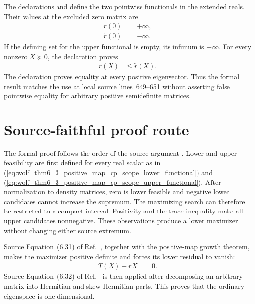 \documentclass[11pt]{article}
\begin{document}
The declarations  and
 define the two pointwise functionals in the
extended reals. Their values at the excluded zero matrix are
\begin{align}
  r(0)
    &=+\infty,
  \label{eq:wolf_thm6_3_positive_map_cp_scope_zero_lower_value}\\
  \widetilde r(0)
    &=-\infty.
  \label{eq:wolf_thm6_3_positive_map_cp_scope_zero_upper_value}
\end{align}
If the defining set for the upper functional is empty, its infimum is
$+\infty$. For every nonzero $X\succeq0$, the declaration
 proves
\begin{align}
  r(X)
    &\leq\widetilde r(X).
  \label{eq:wolf_thm6_3_positive_map_cp_scope_correct_pointwise_order}
\end{align}
The declaration
 proves
equality at every positive eigenvector. Thus the formal result matches the use
at local source lines~649--651 without asserting false pointwise equality for
arbitrary positive semidefinite matrices.

\section{Source-faithful proof route}

The formal proof follows the order of the source argument
\cite[Theorem~6.3]{Wolf2012Quantum}. Lower and upper feasibility are first
defined for every real scalar as in
(\ref{eq:wolf_thm6_3_positive_map_cp_scope_lower_functional}) and
(\ref{eq:wolf_thm6_3_positive_map_cp_scope_upper_functional}). After
normalization to density matrices, zero is lower feasible and negative lower
candidates cannot increase the supremum. The maximizing search can therefore
be restricted to a compact interval. Positivity and the trace inequality make
all upper candidates nonnegative. These observations produce a lower maximizer
without changing either source extremum.

Source Equation~(6.31) of Ref.~\cite{Wolf2012Quantum}, together with the positive-map growth theorem, makes
the maximizer positive definite and forces its lower residual to vanish:
\begin{align}
  T(X)-rX
    &=0.
  \label{eq:wolf_thm6_3_positive_map_cp_scope_vanishing_lower_residual}
\end{align}
Source Equation~(6.32) of Ref.~\cite{Wolf2012Quantum} is then applied after decomposing an arbitrary matrix
into Hermitian and skew-Hermitian parts. This proves that the ordinary
eigenspace is one-dimensional.
\end{document}
